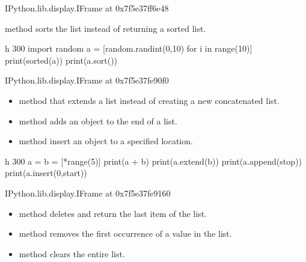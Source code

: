 \documentclass[letterpaper,10pt,english]{sphinxmanual}
\begin{document}
\begin{sphinxVerbatim}[commandchars=\\\{\}]
\PYGZlt{}IPython.lib.display.IFrame at 0x7f5e37ff6e48\PYGZgt{}
\end{sphinxVerbatim}

 method sorts the list  instead of returning a sorted list.

\begin{sphinxVerbatim}[commandchars=\\\{\}]
 \PYGZhy{}h 300
import random
a = [random.randint(0,10) for i in range(10)]
print(sorted(a))
print(a.sort())
\end{sphinxVerbatim}

\begin{sphinxVerbatim}[commandchars=\\\{\}]
\PYGZlt{}IPython.lib.display.IFrame at 0x7f5e37fe90f0\PYGZgt{}
\end{sphinxVerbatim}
\begin{itemize}
\item {} 
 method that extends a list instead of creating a new concatenated list.

\item {} 
 method adds an object to the end of a list.

\item {} 
 method insert an object to a specified location.

\end{itemize}

\begin{sphinxVerbatim}[commandchars=\\\{\}]
 \PYGZhy{}h 300
a = b = [*range(5)]
print(a + b)
print(a.extend(b))
print(a.append(\PYGZsq{}stop\PYGZsq{}))
print(a.insert(0,\PYGZsq{}start\PYGZsq{}))
\end{sphinxVerbatim}

\begin{sphinxVerbatim}[commandchars=\\\{\}]
\PYGZlt{}IPython.lib.display.IFrame at 0x7f5e37fe9160\PYGZgt{}
\end{sphinxVerbatim}
\begin{itemize}
\item {} 
 method deletes and return the last item of the list.

\item {} 
 method removes the first occurrence of a value in the list.

\item {} 
 method clears the entire list.

\end{itemize}
\end{document}
